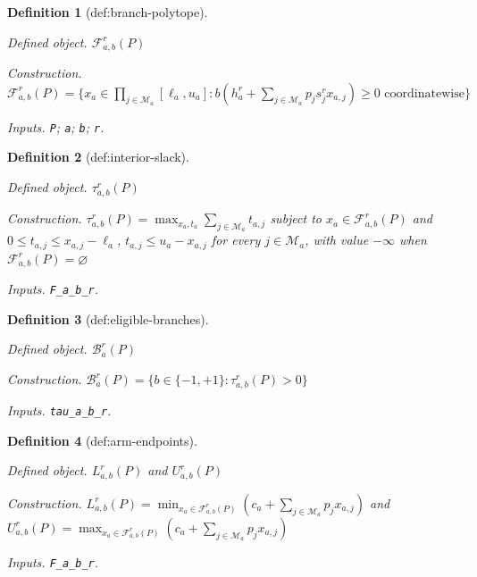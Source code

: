 \documentclass{article}
\newtheorem{definition}{Definition}
\begin{document}
\begin{definition}[def:branch-polytope]\label{def:branch-polytope}
\par\smallskip\noindent\emph{Defined object.} \(\mathcal F_{a,b}^r(P)\)
\par\smallskip\noindent\emph{Construction.} \(\mathcal F_{a,b}^r(P)=\{x_a\in\prod_{j\in\mathcal M_a}[\ell_a,u_a]:b(h_a^r+\sum_{j\in\mathcal M_a}p_js_j^rx_{a,j})\ge0\text{ coordinatewise}\}\)
\par\smallskip\noindent\emph{Inputs.} \texttt{P}; \texttt{a}; \texttt{b}; \texttt{r}.
\end{definition}

\begin{definition}[def:interior-slack]\label{def:interior-slack}
\par\smallskip\noindent\emph{Defined object.} \(\tau_{a,b}^r(P)\)
\par\smallskip\noindent\emph{Construction.} \(\tau_{a,b}^r(P)=\max_{x_a,t_a}\sum_{j\in\mathcal M_a}t_{a,j}\) subject to \(x_a\in\mathcal F_{a,b}^r(P)\) and \(0\le t_{a,j}\le x_{a,j}-\ell_a\), \(t_{a,j}\le u_a-x_{a,j}\) for every \(j\in\mathcal M_a\), with value \(-\infty\) when \(\mathcal F_{a,b}^r(P)=\varnothing\)
\par\smallskip\noindent\emph{Inputs.} \texttt{F\_\allowbreak{}a\_\allowbreak{}b\_\allowbreak{}r}.
\end{definition}

\begin{definition}[def:eligible-branches]\label{def:eligible-branches}
\par\smallskip\noindent\emph{Defined object.} \(\mathcal B_a^r(P)\)
\par\smallskip\noindent\emph{Construction.} \(\mathcal B_a^r(P)=\{b\in\{-1,+1\}:\tau_{a,b}^r(P)>0\}\)
\par\smallskip\noindent\emph{Inputs.} \texttt{tau\_\allowbreak{}a\_\allowbreak{}b\_\allowbreak{}r}.
\end{definition}

\begin{definition}[def:arm-endpoints]\label{def:arm-endpoints}
\par\smallskip\noindent\emph{Defined object.} \(L_{a,b}^r(P)\) and \(U_{a,b}^r(P)\)
\par\smallskip\noindent\emph{Construction.} \(L_{a,b}^r(P)=\min_{x_a\in\mathcal F_{a,b}^r(P)}(c_a+\sum_{j\in\mathcal M_a}p_jx_{a,j})\) and \(U_{a,b}^r(P)=\max_{x_a\in\mathcal F_{a,b}^r(P)}(c_a+\sum_{j\in\mathcal M_a}p_jx_{a,j})\)
\par\smallskip\noindent\emph{Inputs.} \texttt{F\_\allowbreak{}a\_\allowbreak{}b\_\allowbreak{}r}.
\end{definition}
\end{document}
